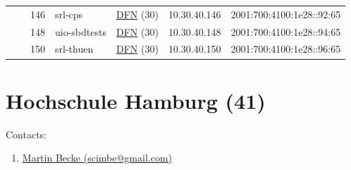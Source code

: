 \begin{small}
\begin{center}
\begin{longtable}{|c|c|c|c|c|c|c|c|}
  &  & \tiny{146} & \multicolumn{1}{|l|}{\tiny{srl-cps}} & \multicolumn{2}{|c|}{\tiny{\href{https://www.dfn.de}{DFN} (30)}} & \tiny{10.30.40.146} & \tiny{2001:700:4100:1e28::92:65} \\* \cline{3-3}\cline{4-4}\cline{5-5}\cline{6-6}\cline{7-7}\cline{8-8}
  &  & \tiny{148} & \multicolumn{1}{|l|}{\tiny{uio-sbdtests}} & \multicolumn{2}{|c|}{\tiny{\href{https://www.dfn.de}{DFN} (30)}} & \tiny{10.30.40.148} & \tiny{2001:700:4100:1e28::94:65} \\* \cline{3-3}\cline{4-4}\cline{5-5}\cline{6-6}\cline{7-7}\cline{8-8}
  &  & \tiny{150} & \multicolumn{1}{|l|}{\tiny{srl-thuen}} & \multicolumn{2}{|c|}{\tiny{\href{https://www.dfn.de}{DFN} (30)}} & \tiny{10.30.40.150} & \tiny{2001:700:4100:1e28::96:65} \\ \hline
\end{longtable}
\end{center}
\end{small}



\section{Hochschule Hamburg (41)}
\label{sec:HAW}

Contacts:
\begin{enumerate}
 \item {}\href{mailto:scimbe@gmail.com}{Martin Becke (scimbe@gmail.com)}
\end{enumerate}

